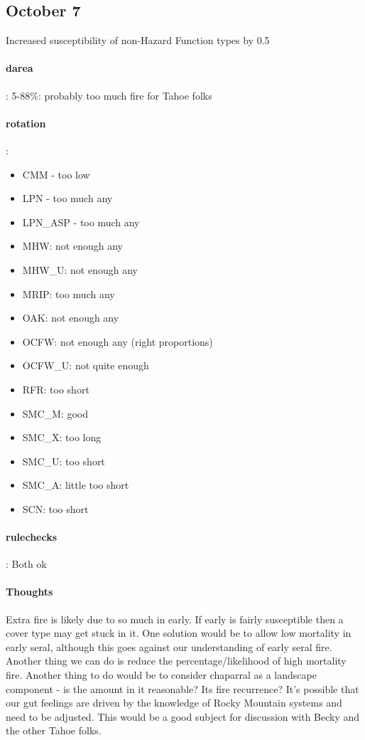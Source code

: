 \subsection{October 7}
Increased susceptibility of non-Hazard Function types by 0.5

\paragraph{darea}: 5-88\%: probably too much fire for Tahoe folks
\paragraph{rotation}: 
\begin{itemize}
\item CMM - too low
\item LPN - too much any
\item LPN\_ASP - too much any
\item MHW: not enough any
\item MHW\_U: not enough any
\item MRIP: too much any
\item OAK: not enough any
\item OCFW: not enough any (right proportions)
\item OCFW\_U: not quite enough
\item RFR: too short
\item SMC\_M: good
\item SMC\_X: too long
\item SMC\_U: too short
\item SMC\_A: little too short
\item SCN: too short
\end{itemize}

\paragraph{rulechecks}: Both ok

\paragraph{Thoughts} Extra fire is likely due to so much in early. If early is fairly susceptible then a cover type may get stuck in it. One solution would be to allow low mortality in early seral, although this goes against our understanding of early seral fire. Another thing we can do is reduce the percentage/likelihood of high mortality fire. Another thing to do would be to consider chaparral as a landscape component - is the amount in it reasonable? Its fire recurrence? It's possible that our gut feelings are driven by the knowledge of Rocky Mountain systems and need to be adjusted. This would be a good subject for discussion with Becky and the other Tahoe folks. 

